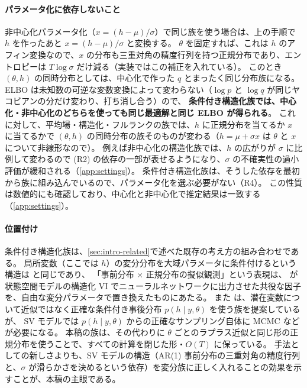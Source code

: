 \paragraph{パラメータ化に依存しないこと}
非中心化パラメータ化（$x = (h - \mu)/\sigma$）で同じ族を使う場合は、上の手順で $h$ を作ったあと $x = (h - \mu)/\sigma$ と変換する。
$\theta$ を固定すれば、これは $h$ のアフィン変換なので、$x$ の分布も三重対角の精度行列を持つ正規分布であり、エントロピーは $T\log\sigma$ だけ減る（実装ではこの補正を入れている）。
このとき $(\theta, h)$ の同時分布としては、中心化で作った $q$ とまったく同じ分布族になる。
ELBO は未知数の可逆な変数変換によって変わらない（$\log p$ と $\log q$ が同じヤコビアンの分だけ変わり、打ち消し合う）ので、
\textbf{条件付き構造化族では、中心化・非中心化のどちらを使っても同じ最適解と同じ ELBO が得られる}。
これに対して、平均場・構造化・フルランクの族では、$h$ に正規分布を当てるか $x$ に当てるかで $(\theta, h)$ の同時分布の族そのものが変わる（$h = \mu + \sigma x$ は $\theta$ と $x$ について非線形なので）。
例えば非中心化の構造化族では、$h$ の広がりが $\sigma$ に比例して変わるので (R2) の依存の一部が表せるようになり、$\sigma$ の不確実性の過小評価が緩和される（\cref{app:settings}）。
条件付き構造化族は、そうした依存を最初から族に組み込んでいるので、パラメータ化を選ぶ必要がない（R4）。
この性質は数値的にも確認しており、中心化と非中心化で推定結果は一致する（\cref{app:settings}）。

\paragraph{位置付け}
条件付き構造化族は、\cref{sec:intro-related}で述べた既存の考え方の組み合わせである。
局所変数（ここでは $h$）の変分分布を大域パラメータに条件付けるという構造は \textcite{tan2020} と同じであり、
「事前分布 × 正規分布の擬似観測」という表現は、\textcite{johnson2016} が状態空間モデルの構造化 VI でニューラルネットワークに出力させた共役な因子を、自由な変分パラメータで置き換えたものにあたる。
また \textcite{loaizamaya2022} は、潜在変数について近似ではなく正確な条件付き事後分布 $p(h \mid y, \theta)$ を使う族を提案しているが、
SV モデルでは $p(h \mid y, \theta)$ からの正確なサンプリング自体に MCMC などが必要になる。
本稿の族は、その代わりに $\theta$ ごとのラプラス近似と同じ形の正規分布を使うことで、すべての計算を閉じた形・$O(T)$ に保っている。
手法としての新しさよりも、SV モデルの構造（AR(1) 事前分布の三重対角の精度行列と、$\sigma$ が滑らかさを決めるという依存）を変分族に正しく入れることの効果を示すことが、本稿の主眼である。

